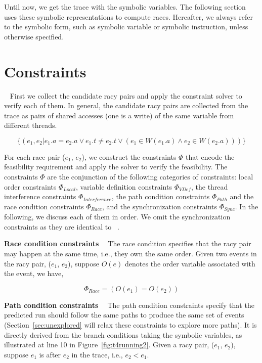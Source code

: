 Until now, we get the trace with the symbolic variables. The following section uses these symbolic representations to compute races. 
Hereafter, we always refer to the symbolic form, such as symbolic variable or symbolic instruction, unless otherwise specified. 


\section{Constraints}~\label{sec:constraints}
First we collect the candidate racy pairs and apply the constraint solver to verify each of them. 
In general, the candidate racy pairs are collected from the trace as  pairs of shared accesses (one is a write) of the same variable from different threads. 


$$
\{(e_1, e_2| e_1.a=e_2.a \vee e_1.t\neq e_2.t \vee (e_1\in W(e_1.a) \wedge e_2\in W(e_2.a) ))\}
$$


For each race pair ($e_1$, $e_2$), we construct the constraints $\Phi$ that encode the feasibility requirement and apply the solver to verify the feasibility. The constraints $\Phi$ are the conjunction of the following categories of constraints: local order constraints $\Phi_{Local}$, variable definition constraints $\Phi_{VDef}$, the thread interference constraints $\Phi_{Interference}$, the path condition constraints $\Phi_{Path}$ and the race condition constraints $\Phi_{Race}$, and the synchronization constraints $\Phi_{Sync}$. In the following, we discuss each of them in  order.
We omit the synchronization constraints as they are identical to ~\cite{jeff}.


{\bf Race condition constraints \ } The race condition specifies that the racy pair may happen at the same time, i.e., they own the same order. 
Given two events in the racy pair, ($e_1$, $e_2$), suppose $O(e)$ denotes the order variable associated with the event, we have,

$$
\Phi_{Race}= (O(e_1)=O(e_2))
$$




{\bf Path condition constraints \ } The path condition constraints specify that the predicted run should follow the same paths to produce the same set of events (Section~\ref{sec:unexplored} will relax these constraints to explore more paths).  It is directly derived from the branch conditions taking the symbolic variables, as illustrated at line 10 in Figure~\ref{fig:t4running2}.
Given a racy pair, ($e_1$, $e_2$), suppose $e_1$ is after $e_2$ in the trace, i.e., $e_2< e_1$. 

